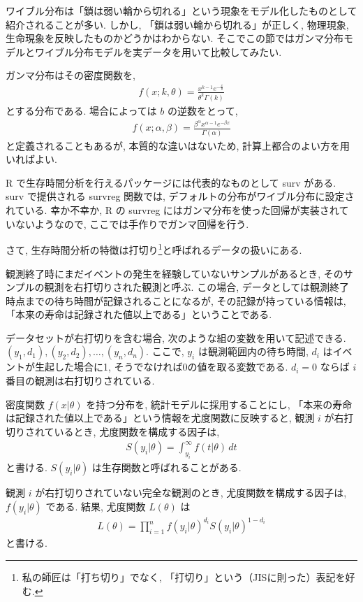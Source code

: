 \documentclass[a4paper, 12pt]{jarticle}
\begin{document}
ワイブル分布は「鎖は弱い輪から切れる」という現象をモデル化したものとして紹介されることが多い.
しかし, 「鎖は弱い輪から切れる」が正しく, 物理現象, 生命現象を反映したものかどうかはわからない.
そこでこの節ではガンマ分布モデルとワイブル分布モデルを実データを用いて比較してみたい.

ガンマ分布はその密度関数を,
\begin{align}
f(x;k,\theta) =  \frac{x^{k-1}e^{-\frac{x}{\theta}}}{\theta^k\Gamma(k)}
\label{gammadens}
\end{align}
とする分布である. 場合によっては $b$ の逆数をとって,
\begin{align}
f(x;\alpha ,\beta )=\frac {\beta ^{\alpha }x^{\alpha -1}e^{-\beta x}}{\Gamma (\alpha )}
\end{align}
と定義されることもあるが, 本質的な違いはないため, 計算上都合のよい方を用いればよい.

R で生存時間分析を行えるパッケージには代表的なものとして surv がある. 
surv で提供される survreg 関数では, デフォルトの分布がワイブル分布に設定されている.
幸か不幸か, R の survreg にはガンマ分布を使った回帰が実装されていないようなので, ここでは手作りでガンマ回帰を行う. 

さて, 生存時間分析の特徴は打切り\footnote{私の師匠は「打ち切り」でなく, 「打切り」という（JISに則った）表記を好む.}と呼ばれるデータの扱いにある.

観測終了時にまだイベントの発生を経験していないサンプルがあるとき, そのサンプルの観測を右打切りされた観測と呼ぶ.  
この場合, データとしては観測終了時点までの待ち時間が記録されることになるが, その記録が持っている情報は, 「本来の寿命は記録された値以上である」ということである.

データセットが右打切りを含む場合, 次のような組の変数を用いて記述できる.
$(y_1, d_1), (y_2, d_2), \ldots , (y_n, d_n)$.
ここで, $y_i$ は観測範囲内の待ち時間, $d_i$ はイベントが生起した場合に1, そうでなければ0の値を取る変数である. $d_i=0$ ならば $i$ 番目の観測は右打切りされている.

密度関数 $f(x|\theta)$ を持つ分布を, 統計モデルに採用することにし,  「本来の寿命は記録された値以上である」という情報を尤度関数に反映すると, 観測 $i$ が右打切りされているとき, 尤度関数を構成する因子は, 
\begin{align}
S(y_i|\theta) = \int_{y_i}^{\infty} f(t|\theta) \, dt
\end{align}
と書ける. $S(y_i|\theta)$ は生存関数と呼ばれることがある.

観測 $i$ が右打切りされていない完全な観測のとき, 尤度関数を構成する因子は, $f(y_i|\theta)$ である.
結果, 尤度関数 $L(\theta)$ は
\begin{align}
L(\theta)=\prod_{i=1}^{n}f(y_i|\theta)^{d_i}S(y_i|\theta)^{1-d_i}
\end{align}
と書ける.
\end{document}
